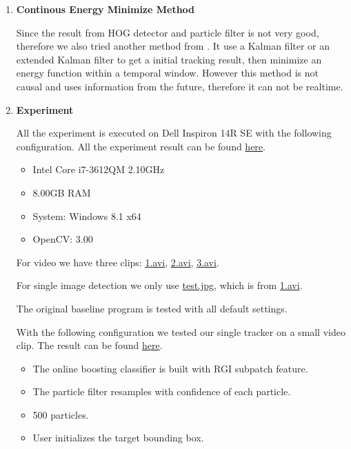 \documentclass[a4paper]{article}
\begin{document}
\begin{enumerate}
\item \textbf{Continous Energy Minimize Method}

Since the result from HOG detector and particle filter is not very good, therefore we also tried another method from \cite{Milan:2014:CEM}\cite{Andriyenko:2011:AFG}\cite{Andriyenko:2011:MTT}. It use a Kalman filter or an extended Kalman filter to get a initial tracking result, then minimize an energy function within a temporal window. However this method is not causal and uses information from the future, therefore it can not be realtime.

\item \textbf{Experiment}

All the experiment is executed on Dell Inspiron 14R SE with the following configuration.
All the experiment result can be found \href{https://zerowong.github.io/PedestrainCounting/results/}{here}.

\begin{itemize}

\item Intel Core i7-3612QM 2.10GHz
\item 8.00GB RAM
\item System: Windows 8.1 x64
\item OpenCV: 3.00

\end{itemize}

For video we have three clips: \href{https://zerowong.github.io/PedestrainCounting/results/test/1.avi}{1.avi}, \href{https://zerowong.github.io/PedestrainCounting/results/test/2.avi}{2.avi}, \href{https://zerowong.github.io/PedestrainCounting/results/test/3.avi}{3.avi}.

For single image detection we only use \href{https://zerowong.github.io/PedestrainCounting/results/test/test.jpg}{test.jpg}, which is from \href{https://zerowong.github.io/PedestrainCounting/results/test/1.avi}{1.avi}.

The original baseline program is tested with all default settings.

With the following configuration we tested our single tracker on a small video clip. The result can be found \href{https://zerowong.github.io/PedestrainCounting/results/singleTrackerTestGray01.avi}{here}.

\begin{itemize}

\item The online boosting classifier is built with RGI subpatch feature.
\item The particle filter resamples with confidence of each particle.
\item 500 particles.
\item User initializes the target bounding box.


\end{itemize}
\end{enumerate}
\end{document}
